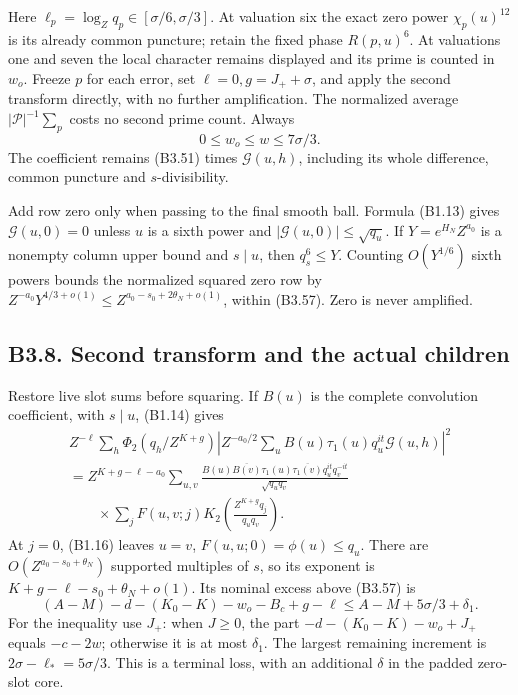 \documentclass[11pt,a4paper]{article}
\begin{document}
Here \(\ell_p=\log_Zq_p\in[\sigma/6,\allowbreak{}\sigma/3]\). At valuation six the
exact zero power \(\chi_p(u)^{12}\) is its already common puncture;
retain the fixed phase \(R(p,\allowbreak{}u)^6\). At valuations one and seven the
local character remains displayed and its prime is counted in \(w_o\).
Freeze \(p\) for each error, set \(\ell=0,\allowbreak{}g=J_++\sigma\), and apply the
second transform directly, with no further amplification. The normalized
average \(|\mathcal P|^{-1}\sum_p\) costs no second prime count. Always
\[
0\le w_o\le w\le7\sigma/3.
\tag{B3.59}
\] The coefficient remains (B3.51) times \(\mathcal G(u,\allowbreak{}h)\), including
its whole difference, common puncture and \(s\)-divisibility.

Add row zero only when passing to the final smooth ball. Formula (B1.13)
gives \(\mathcal G(u,\allowbreak{}0)=0\) unless \(u\) is a sixth power and
\(|\mathcal G(u,\allowbreak{}0)|\le\sqrt{q_u}\). If \(Y=e^{H_N}Z^{a_0}\) is a
nonempty column upper bound and \(s\mid u\), then \(q_s^6\le Y\).
Counting \(O(Y^{1/6})\) sixth powers bounds the normalized squared zero
row by \(Z^{-a_0}Y^{4/3+o(1)}\le Z^{a_0-s_0+2\theta_N+o(1)}\), within
(B3.57). Zero is never amplified.

\hypertarget{b3.8.-second-transform-and-the-actual-children}{%
\subsection{B3.8. Second transform and the actual
children}\label{b3.8.-second-transform-and-the-actual-children}}

Restore live slot sums before squaring. If \(B(u)\) is the complete
convolution coefficient, with \(s\mid u\), (B1.14) gives \[
\begin{gathered}
Z^{-\ell}\sum_h\Phi_2(q_h/Z^{K+g})
 \left|Z^{-a_0/2}\sum_u B(u)\tau_1(u)q_u^{it}\mathcal G(u,h)\right|^2\\
=Z^{K+g-\ell-a_0}\sum_{u,v}
 \frac{B(u)\overline{B(v)}\tau_1(u)\overline{\tau_1(v)}q_u^{it}q_v^{-it}}
      {\sqrt{q_uq_v}}\\
\qquad{}\times\sum_jF(u,v;j)K_2\!\left(\frac{Z^{K+g}q_j}{q_uq_v}\right).
\end{gathered}
\tag{B3.60}
\] At \(j=0\), (B1.16) leaves \(u=v\), \(F(u,\allowbreak{}u;0)=\phi(u)\le q_u\).
There are \(O(Z^{a_0-s_0+\theta_N})\) supported multiples of \(s\), so
its exponent is \(K+g-\ell-s_0+\theta_N+o(1)\). Its nominal excess above
(B3.57) is \[
(A-M)-d-(K_0-K)-w_o-B_c+g-\ell
\le A-M+5\sigma/3+\delta_1.
\tag{B3.61}
\] For the inequality use \(J_+\): when \(J\ge0\), the part
\(-d-(K_0-K)-w_o+J_+\) equals \(-c-2w\); otherwise it is at most
\(\delta_1\). The largest remaining increment is
\(2\sigma-\ell_*=5\sigma/3\). This is a terminal loss, with an
additional \(\delta\) in the padded zero-slot core.
\end{document}
